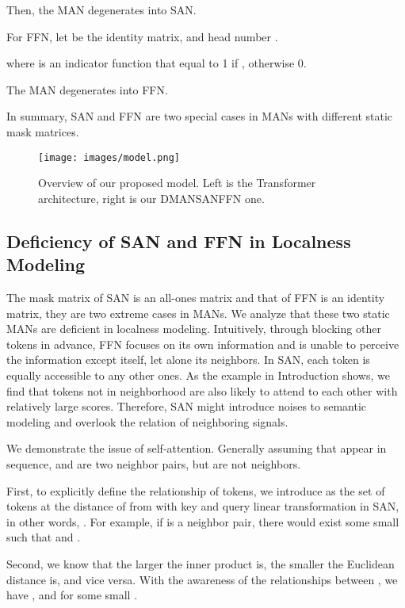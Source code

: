 \documentclass[11pt]{article}
\begin{document}
Then, the MAN degenerates into SAN.



For FFN, let  be the identity matrix,  and head number . 

where  is an indicator function that equal to 1 if , otherwise 0. 

The MAN degenerates into FFN.


In summary, SAN and FFN are two special cases in MANs with different static mask matrices. 

\begin{figure}[t]
    \centering
    \texttt{[image: images/model.png]}
	\caption{Overview of our proposed model. Left is the Transformer architecture, right is our DMANSANFFN one.}\label{model.figure}
\end{figure}

\subsection{Deficiency of SAN and FFN in Localness Modeling}
\label{deficiency-of-san-and-ffn-in-localness-modeling}
The mask matrix of SAN is an all-ones matrix and that of FFN is an identity matrix, they are two extreme cases in MANs. We analyze that these two static MANs are deficient in localness modeling.
Intuitively, through blocking other tokens in advance, FFN focuses on its own information and is unable to perceive the information except itself, let alone its neighbors. In SAN, each token is equally accessible to any other ones. As the example in Introduction shows, we find that tokens not in neighborhood are also likely to attend to each other with relatively large scores. Therefore, SAN might introduce noises to semantic modeling and overlook the relation of neighboring signals.








We demonstrate the issue of self-attention. Generally assuming that  appear in sequence, and  are two neighbor pairs, but  are not neighbors. 

First, to explicitly define the relationship of tokens, we introduce  as the set of tokens at the distance of  from  with key and query linear transformation in SAN, in other words, . For example, if  is a neighbor pair, there would exist some small  such that  and .



Second, we know that the larger the inner product is, the smaller the Euclidean distance is, and vice versa. With the awareness of the relationships between , we have ,  and  for some small . 
\end{document}
